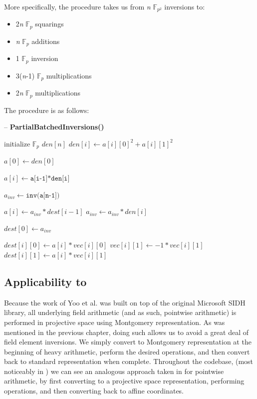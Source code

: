 More specifically, the procedure takes us from \textit{n} $\mathbb{F}_{p^{2}}$  inversions to: 
\begin{center}
\begin{itemize}
\item 2\textit{n} $\mathbb{F}_{p}$ squarings
\item \textit{n} $\mathbb{F}_{p}$ additions
\item 1 $\mathbb{F}_{p}$ inversion
\item 3(\textit{n}-1) $\mathbb{F}_{p}$ multiplications
\item 2\textit{n} $\mathbb{F}_{p}$ multiplications
\end{itemize}
\end{center}

The procedure is as follows:\\

\begin{algorithm}
\caption{-- \textbf{PartialBatchedInversions()}}\label{alg:pbinvmath}
\begin{algorithmic}[1]
\State initialize $\mathbb{F}_{p}$ $den[n]$
	\State $den[i] \gets a[i][0]^{2} + a[i][1]^{2}$
\EndFor

\State $a[0] \gets den[0]$

	\State $a[i] \gets \texttt{a[i-1]*den[i]}$
\EndFor

\State $a_{inv} \gets \texttt{inv(a[n-1])}$

	\State $a[i] \gets a_{inv}*dest[i-1]$
	\State $a_{inv} \gets a_{inv}*den[i]$
\EndFor

\State $dest[0] \gets a_{inv}$

	\State $dest[i][0] \gets a[i]*vec[i][0]$
	\State $vec[i][1] \gets -1*vec[i][1]$
	\State $dest[i][1] \gets a[i]*vec[i][1]$
\EndFor
\EndProcedure
\end{algorithmic}
\end{algorithm}


\subsection{Applicability to \sidh}

Because the work of Yoo et al. was built on top of the original Microsoft SIDH library, all underlying field arithmetic (and as such, pointwise arithmetic) is performed in projective space using Montgomery representation. As was mentioned in the previous chapter, doing such allows us to avoid a great deal of field element inversions. We simply convert to Montgomery representation at the beginning of heavy arithmetic, perform the desired operations, and then convert back to standard representation when complete. Throughout the codebase, (most noticeably in ) we can see an analogous approach taken in for pointwise arithmetic, by first converting to a projective space representation, performing operations, and then converting back to affine coordinates. 

